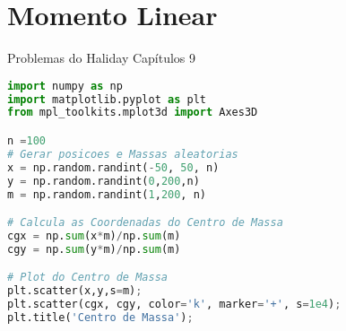 \chapter{Momento Linear}
Problemas do Haliday Capítulos 9

\begin{lstlisting}[language=Python, frame=lines,basicstyle=\footnotesize, caption={Determinando Centro de Massa de uma distribuição aleatória em 2D}, label={lst:2DCM}]
import numpy as np
import matplotlib.pyplot as plt
from mpl_toolkits.mplot3d import Axes3D

n =100
# Gerar posicoes e Massas aleatorias
x = np.random.randint(-50, 50, n)
y = np.random.randint(0,200,n)
m = np.random.randint(1,200, n)

# Calcula as Coordenadas do Centro de Massa
cgx = np.sum(x*m)/np.sum(m)
cgy = np.sum(y*m)/np.sum(m)

# Plot do Centro de Massa
plt.scatter(x,y,s=m);
plt.scatter(cgx, cgy, color='k', marker='+', s=1e4);
plt.title('Centro de Massa');
\end{lstlisting}

